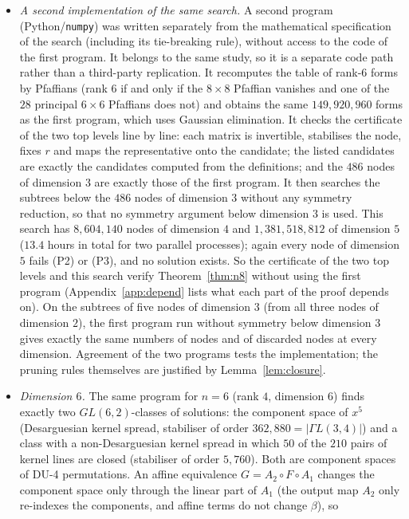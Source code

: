 \documentclass[11pt]{article}
\theoremstyle{definition}
\begin{document}
\begin{itemize}
\item \emph{A second implementation of the same search.} A second program
(Python/\texttt{numpy}) was written separately from the mathematical specification of the
search (including its tie-breaking rule), without access to the code of the first program. It
belongs to the same study, so it is a separate code path rather than a third-party
replication. It recomputes the table
of rank-$6$ forms by Pfaffians (rank $6$ if and only if the $8\times8$ Pfaffian vanishes and one of
the $28$ principal $6\times6$ Pfaffians does not) and obtains the same $149{,}920{,}960$ forms as
the first program, which uses Gaussian elimination. It checks the certificate of the two top
levels line by line: each matrix is invertible, stabilises the node, fixes $r$ and maps the
representative onto the candidate; the listed candidates are exactly the candidates computed
from the definitions; and the $486$ nodes of dimension $3$ are exactly those of the first
program. It then searches the subtrees below the $486$ nodes of dimension $3$ without any
symmetry reduction, so that no symmetry argument below dimension $3$ is used. This search has
$8{,}604{,}140$ nodes of dimension $4$ and $1{,}381{,}518{,}812$ of dimension $5$ ($13.4$
hours in total for two parallel processes); again every node of dimension $5$ fails (P2) or (P3), and no solution exists. So the
certificate of the two top levels and this search verify Theorem~\ref{thm:n8} without using the
first program (Appendix~\ref{app:depend} lists what each part of the proof depends on). On the
subtrees of five nodes of dimension
$3$ (from all three nodes of dimension $2$), the first program run without symmetry below
dimension $3$ gives exactly the same numbers of nodes and of discarded nodes at every dimension.
Agreement of the two programs tests the implementation; the pruning rules themselves are
justified by Lemma~\ref{lem:closure}.
\item \emph{Dimension $6$.} The same program for $n=6$ (rank $4$, dimension $6$) finds exactly
two $GL(6,2)$-classes of solutions: the component space of $x^5$ (Desarguesian kernel spread,
stabiliser of order $362{,}880=|\Gamma L(3,4)|$) and a class with a non-Desarguesian kernel
spread in which $50$ of the $210$ pairs of kernel lines are closed (stabiliser of order
$5{,}760$). Both are component spaces of DU-4 permutations. An affine equivalence
$G=A_2\circ F\circ A_1$ changes the component space only through the linear part of $A_1$ (the
output map $A_2$ only re-indexes the components, and affine terms do not change $\beta$), so

\end{itemize}
\end{document}
